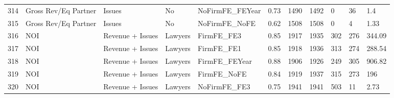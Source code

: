 \begin{table}[ht]
\begin{tabular}{rllllllllll}
  314 & Gross Rev/Eq Partner & Issues & No & NoFirmFE\_FEYear & 0.73 & 1490 & 1492 & 0 & 36 & 1.4 \\ 
  315 & Gross Rev/Eq Partner & Issues & No & NoFirmFE\_NoFE & 0.62 & 1508 & 1508 & 0 & 4 & 1.33 \\ 
  316 & NOI & Revenue + Issues & Lawyers & FirmFE\_FE3 & 0.85 & 1917 & 1935 & 302 & 276 & 344.09 \\ 
  317 & NOI & Revenue + Issues & Lawyers & FirmFE\_FE1 & 0.85 & 1918 & 1936 & 313 & 274 & 288.54 \\ 
  318 & NOI & Revenue + Issues & Lawyers & FirmFE\_FEYear & 0.88 & 1906 & 1926 & 249 & 305 & 906.82 \\ 
  319 & NOI & Revenue + Issues & Lawyers & FirmFE\_NoFE & 0.84 & 1919 & 1937 & 315 & 273 & 196 \\ 
  320 & NOI & Revenue + Issues & Lawyers & NoFirmFE\_FE3 & 0.75 & 1941 & 1941 & 503 & 11 & 2.73 \\ 
   \hline
\end{tabular}
\end{table}

